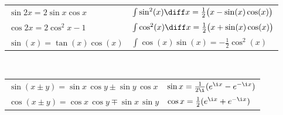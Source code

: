 \documentclass[fs, footer]{latex4ei}
\begin{document}
\begin{multicols*}{4}
{\begin{tabular*}{\columnwidth}{@{\extracolsep\fill}ll@{}}
 	$\sin 2x = 2 \sin x \cos x $  & $\int \sin^2(x) \diff x = \frac12 \bigl(x - \sin(x)\cos(x) \bigr)$\\ 
 	$\cos 2x = 2\cos^2 x - 1$  & $\int \cos^2(x) \diff x = \frac12 \bigl(x + \sin(x)\cos(x) \bigr)$\\
 	$\sin(x) = \tan(x)\cos(x)$ & $\int \cos(x)\sin(x) = -\frac12 \cos^2(x)$ \\
\end{tabular*}\\[1em]
\begin{tabular*}{\columnwidth}{@{\extracolsep\fill}ll@{}}
$\sin ( x \pm y ) = \sin x \, \cos y \pm \sin y \, \cos x$ & $\sin x = \frac{1}{2 \i} (e^{\i x} - e^{- \i x })$\\
$\cos ( x \pm y ) = \cos x \, \cos y \mp \sin x \, \sin y$ & $\cos x = \frac{1}{2} (e^{\i x} + e^{- \i x })$\\
\end{tabular*}
}

\sectionbox{
}
\end{multicols*}
\end{document}
